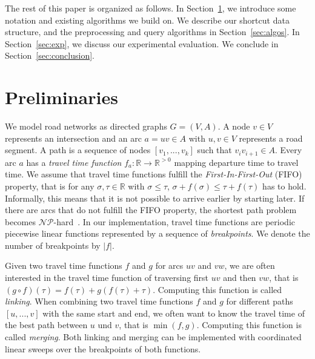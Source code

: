 \documentclass[a4paper,UKenglish,cleveref,autoref]{lipics-v2019}
\begin{document}
The rest of this paper is organized as follows.
In Section~\ref{sec:prelim}, we introduce some notation and existing algorithms we build on.
We describe our shortcut data structure, and the preprocessing and query algorithms in Section~\ref{sec:algos}.
In Section~\ref{sec:exp}, we discuss our experimental evaluation.
We conclude in Section~\ref{sec:conclusion}.

\section{Preliminaries}\label{sec:prelim}
We model road networks as directed graphs $G=(V,A)$.
A node $v \in V$ represents an intersection and an arc $a=uv \in A$ with $u,v \in V$ represents a road segment.
A path is a sequence of nodes $[v_1, ..., v_k]$ such that $v_i v_{i+1} \in A$.
Every arc $a$ has a \emph{travel time function} $f_a: \mathbb{R} \to \mathbb{R}^{>0}$ mapping departure time to travel time.
We assume that travel time functions fulfill the \emph{First-In-First-Out} (FIFO) property, that is for any $\sigma, \tau \in \mathbb{R}$ with $\sigma \leq \tau$, $\sigma + f(\sigma) \leq \tau + f(\tau)$ has to hold.
Informally, this means that it is not possible to arrive earlier by starting later.
If there are arcs that do not fulfill the FIFO property, the shortest path problem becomes $\mathcal{NP}$-hard~\cite{or-tnp-89}.
In our implementation, travel time functions are periodic piecewise linear functions represented by a sequence of \emph{breakpoints}.
We denote the number of breakpoints by $|f|$.

Given two travel time functions $f$ and $g$ for arcs $uv$ and $vw$, we are often interested in the travel time function of traversing first $uv$ and then $vw$, that is $(g \circ f)(\tau) = f(\tau) + g(f(\tau) + \tau)$.
Computing this function is called \emph{linking}.
When combining two travel time functions $f$ and $g$ for different paths $[u,...,v]$ with the same start and end, we often want to know the travel time of the best path between $u$ und $v$, that is $\min(f, g)$.
Computing this function is called \emph{merging}.
Both linking and merging can be implemented with coordinated linear sweeps over the breakpoints of both functions. %
\end{document}
